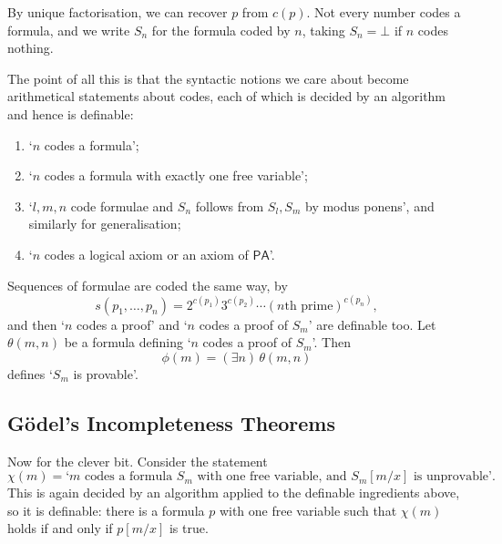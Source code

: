 \documentclass[a4paper]{scrartcl}
\newcommand{\PA}{\mathsf{PA}}
\begin{document}
\begin{center}
\end{center}

By unique factorisation, we can recover $p$ from $c(p)$. Not every number codes a formula, and we write $S_n$ for the formula coded by $n$, taking $S_n = \bot$ if $n$ codes nothing.

The point of all this is that the syntactic notions we care about become arithmetical statements about codes, each of which is decided by an algorithm and hence is definable:
\begin{enumerate}[label=(\roman*)]
  \item `$n$ codes a formula';
  \item `$n$ codes a formula with exactly one free variable';
  \item `$l, m, n$ code formulae and $S_n$ follows from $S_l, S_m$ by modus ponens', and similarly for generalisation;
  \item `$n$ codes a logical axiom or an axiom of $\PA$'.
\end{enumerate}
Sequences of formulae are coded the same way, by
$$s(p_1, \dots, p_n) = 2^{c(p_1)} 3^{c(p_2)} \cdots (n\text{th prime})^{c(p_n)},$$
and then `$n$ codes a proof' and `$n$ codes a proof of $S_m$' are definable too. Let $\theta(m, n)$ be a formula defining `$n$ codes a proof of $S_m$'. Then
$$\phi(m) = (\exists n)\,\theta(m, n)$$
defines `$S_m$ is provable'.

\subsection{G\"odel's Incompleteness Theorems}

Now for the clever bit. Consider the statement
$$\chi(m) = \text{`$m$ codes a formula $S_m$ with one free variable, and $S_m[m/x]$ is unprovable'}.$$
This is again decided by an algorithm applied to the definable ingredients above, so it is definable: there is a formula $p$ with one free variable such that $\chi(m)$ holds if and only if $p[m/x]$ is true.
\end{document}
